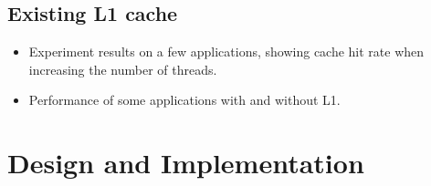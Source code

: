 \subsection{Existing L1 cache}

\begin{itemize}

\item Experiment results on a few applications, showing cache hit rate when increasing the number of threads.

\item Performance of some applications with and without L1.

\end{itemize}



\section{Design and Implementation}





